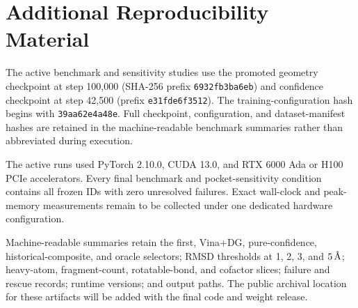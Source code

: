 \section{Additional Reproducibility Material}

The active benchmark and sensitivity studies use the promoted geometry
checkpoint at step 100,000 (SHA-256 prefix \texttt{6932fb3ba6eb}) and
confidence checkpoint at step 42,500 (prefix \texttt{e31fde6f3512}). The
training-configuration hash begins with \texttt{39aa62e4a48e}. Full
checkpoint, configuration, and dataset-manifest hashes are retained in the
machine-readable benchmark summaries rather than abbreviated during
execution.

The active runs used PyTorch 2.10.0, CUDA 13.0, and RTX 6000 Ada or H100 PCIe
accelerators. Every final benchmark and pocket-sensitivity condition contains
all frozen IDs with zero unresolved failures. Exact wall-clock and peak-memory
measurements remain to be collected under one dedicated hardware
configuration.

Machine-readable summaries retain the first, Vina+DG, pure-confidence,
historical-composite, and oracle selectors; RMSD thresholds at 1, 2, 3, and
\(5\,\text{\normalfont\AA}\); heavy-atom, fragment-count, rotatable-bond, and cofactor
slices; failure and rescue records; runtime versions; and output paths. The
public archival location for these artifacts will be added with the final
code and weight release.

